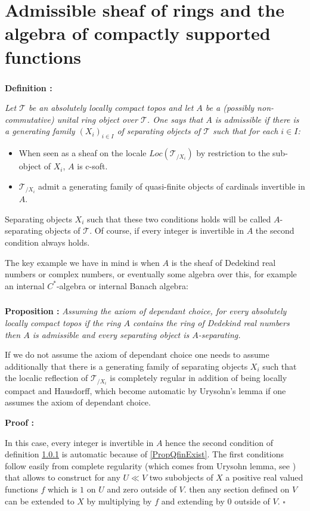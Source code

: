 \documentclass[a4paper]{article}
\newcommand{\Tcal}{\mathcal{T}}
\newcommand{\block}[1]
{

\par \subsubsection{} #1

\bigskip}
\newcommand{\Prop}[1]
	{

	\bigskip
	
	\textbf{Proposition : }{\itshape #1}
		
	\bigskip
	
	}
\newcommand{\Def}[1]
	{
	
	\bigskip
	
	\textbf{Definition : }{\itshape #1}
	
	\bigskip
	
	}
\newcommand{\Dem}[1]{
	
	\smallskip
	
	\textbf{Proof : } \par
	 {#1} $\square$
	 
	 \bigskip
}
\begin{document}
\section{Admissible sheaf of rings and the algebra of compactly supported functions }

\label{Sec_Main}


\block{\label{DefAdmissibleSR}\Def{Let $\Tcal$ be an absolutely locally compact topos and let $A$ be a (possibly non-commutative) unital ring object over $\Tcal$. One says that $A$ is admissible if there is a generating family $(X_i)_{i \in I}$ of separating objects of $\Tcal$ such that for each $i \in I$:

\begin{itemize}

\item When seen as a sheaf on the locale $Loc(\Tcal_{/X_i})$ by restriction to the sub-object of $X_i$, $A$ is c-soft.

\item $\Tcal_{/X_i}$ admit a generating family of quasi-finite objects of cardinals invertible in $A$.

\end{itemize}
}

Separating objects $X_i$ such that these two conditions holds will be called $A$-separating objects of $\Tcal$. Of course, if every integer is invertible in $A$ the second condition always holds.

The key example we have in mind is when $A$ is the sheaf of Dedekind real numbers or complex numbers, or eventually some algebra over this, for example an internal $C^*$-algebra or internal Banach algebra:
}

\block{\Prop{Assuming the axiom of dependant choice, for every absolutely locally compact topos if the ring $A$ contains the ring of Dedekind real numbers then $A$ is admissible and every separating object is $A$-separating. }

If we do not assume the axiom of dependant choice one needs to assume additionally that there is a generating family of separating objects $X_i$ such that the localic reflection of $\Tcal_{/X_i}$ is completely regular in addition of being locally compact and Hausdorff, which become automatic by Urysohn's lemma if one assumes the axiom of dependant choice.

\Dem{In this case, every integer is invertible in $A$ hence the second condition of definition \ref{DefAdmissibleSR} is automatic because of \ref{PropQfinExist}. The first conditions follow easily from complete regularity (which comes from Urysohn lemma, see \cite[XIV.5 and 6]{picado2012frames}) that allows to construct for any $U \ll V$ two subobjects of $X$ a positive real valued functions $f$ which is $1$ on $U$ and zero outside of $V$. then any section defined on $V$ can be extended to $X$ by multiplying by $f$ and extending by $0$ outside of $V$. }
}
\end{document}
